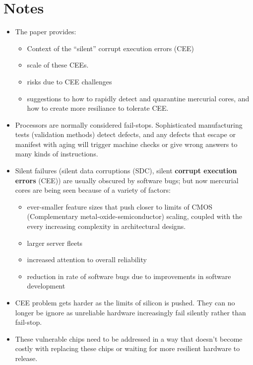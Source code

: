 \documentclass [12pt]{article}
\begin{document}
    \section{Notes}
        \begin{itemize}
            \item The paper provides:
                \begin{itemize}
                    \item Context of the ``silent'' corrupt execution errors (CEE)
                    \item scale of these CEEs. 
                    \item risks due to CEE challenges 
                    \item suggestions to how to rapidly detect and quarantine mercurial cores, and how to create more resiliance to tolerate CEE. 
                \end{itemize}
            \item Processors are normally considered fail-stops. Sophisticated manufacturing tests (validation methods) detect defects, and any defects that escape or manifest with aging will trigger machine checks or give wrong answers to many kinds of instructions. 
            \item Silent failures (silent data corruptions (SDC), silent \textbf{corrupt execution errors} (CEE)) are usually obscured by software bugs; but now mercurial cores are being seen because of a variety of factors:
                \begin{itemize}
                    \item ever-smaller feature sizes that push closer to limits of CMOS (Complementary metal-oxide-semiconductor) scaling, coupled with the every increasing complexity in architectural designs. 
                    \item larger server fleets 
                    \item increased attention to overall reliability 
                    \item reduction in rate of software bugs due to improvements in software development
                \end{itemize}
            \item CEE problem gets harder as the limits of silicon is pushed. They can no longer be ignore as unreliable hardware increasingly fail silently rather than fail-stop. 
            \item These vulnerable chips need to be addressed in a way that doesn't become costly with replacing these chips or waiting for more resilient hardware to release. 

\end{itemize}
\end{document}
